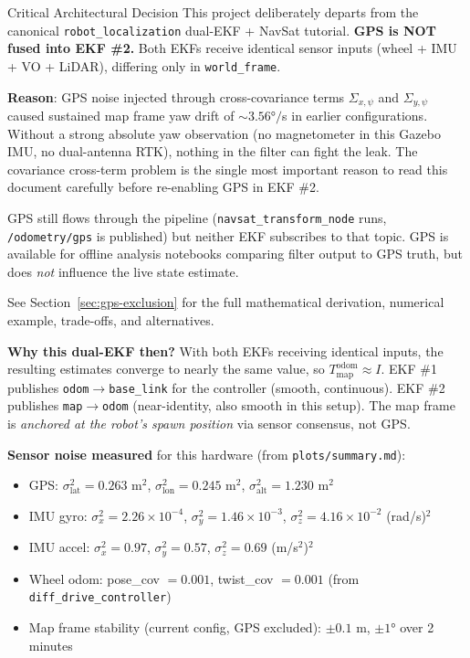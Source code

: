 \documentclass[11pt,a4paper]{article}
\begin{document}
\begin{warnbox}{Critical Architectural Decision}
This project deliberately departs from the canonical \texttt{robot\_localization} dual-EKF + NavSat tutorial. \textbf{GPS is NOT fused into EKF \#2.} Both EKFs receive identical sensor inputs (wheel + IMU + VO + LiDAR), differing only in \texttt{world\_frame}.

\textbf{Reason}: GPS noise injected through cross-covariance terms $\Sigma_{x,\psi}$ and $\Sigma_{y,\psi}$ caused sustained map frame yaw drift of $\sim 3.56°/$s in earlier configurations. Without a strong absolute yaw observation (no magnetometer in this Gazebo IMU, no dual-antenna RTK), nothing in the filter can fight the leak. The covariance cross-term problem is the single most important reason to read this document carefully before re-enabling GPS in EKF \#2.

GPS still flows through the pipeline (\texttt{navsat\_transform\_node} runs, \texttt{/odometry/gps} is published) but neither EKF subscribes to that topic. GPS is available for offline analysis notebooks comparing filter output to GPS truth, but does \emph{not} influence the live state estimate.

See Section~\ref{sec:gps-exclusion} for the full mathematical derivation, numerical example, trade-offs, and alternatives.
\end{warnbox}

\textbf{Why this dual-EKF then?} With both EKFs receiving identical inputs, the resulting estimates converge to nearly the same value, so $T_{\text{map}}^{\text{odom}} \approx I$. EKF \#1 publishes \texttt{odom}$\to$\texttt{base\_link} for the controller (smooth, continuous). EKF \#2 publishes \texttt{map}$\to$\texttt{odom} (near-identity, also smooth in this setup). The map frame is \emph{anchored at the robot's spawn position} via sensor consensus, not GPS.

\textbf{Sensor noise measured} for this hardware (from \texttt{plots/summary.md}):
\begin{itemize}
\item GPS: $\sigma_{\text{lat}}^2 = 0.263$ m$^2$, $\sigma_{\text{lon}}^2 = 0.245$ m$^2$, $\sigma_{\text{alt}}^2 = 1.230$ m$^2$
\item IMU gyro: $\sigma_x^2 = 2.26 \times 10^{-4}$, $\sigma_y^2 = 1.46 \times 10^{-3}$, $\sigma_z^2 = 4.16 \times 10^{-2}$ (rad/s)$^2$
\item IMU accel: $\sigma_x^2 = 0.97$, $\sigma_y^2 = 0.57$, $\sigma_z^2 = 0.69$ (m/s$^2$)$^2$
\item Wheel odom: pose\_cov $= 0.001$, twist\_cov $= 0.001$ (from \texttt{diff\_drive\_controller})
\item Map frame stability (current config, GPS excluded): $\pm 0.1$ m, $\pm 1°$ over 2 minutes
\end{itemize}
\end{document}
